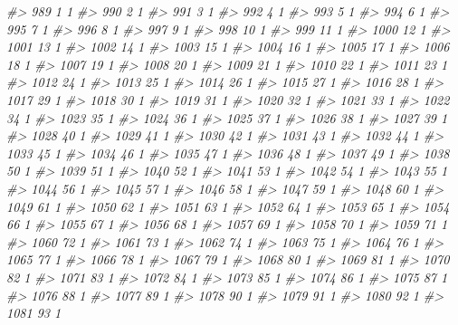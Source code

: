 \documentclass[]{article}
\newenvironment{Shaded}{\begin{snugshade}}{\end{snugshade}}
\newcommand{\CommentTok}[1]{\textcolor[rgb]{0.56,0.35,0.01}{\textit{#1}}}
\begin{document}
\begin{Shaded}
\begin{Highlighting}[]
\CommentTok{#> 989    1  1}
\CommentTok{#> 990    2  1}
\CommentTok{#> 991    3  1}
\CommentTok{#> 992    4  1}
\CommentTok{#> 993    5  1}
\CommentTok{#> 994    6  1}
\CommentTok{#> 995    7  1}
\CommentTok{#> 996    8  1}
\CommentTok{#> 997    9  1}
\CommentTok{#> 998   10  1}
\CommentTok{#> 999   11  1}
\CommentTok{#> 1000  12  1}
\CommentTok{#> 1001  13  1}
\CommentTok{#> 1002  14  1}
\CommentTok{#> 1003  15  1}
\CommentTok{#> 1004  16  1}
\CommentTok{#> 1005  17  1}
\CommentTok{#> 1006  18  1}
\CommentTok{#> 1007  19  1}
\CommentTok{#> 1008  20  1}
\CommentTok{#> 1009  21  1}
\CommentTok{#> 1010  22  1}
\CommentTok{#> 1011  23  1}
\CommentTok{#> 1012  24  1}
\CommentTok{#> 1013  25  1}
\CommentTok{#> 1014  26  1}
\CommentTok{#> 1015  27  1}
\CommentTok{#> 1016  28  1}
\CommentTok{#> 1017  29  1}
\CommentTok{#> 1018  30  1}
\CommentTok{#> 1019  31  1}
\CommentTok{#> 1020  32  1}
\CommentTok{#> 1021  33  1}
\CommentTok{#> 1022  34  1}
\CommentTok{#> 1023  35  1}
\CommentTok{#> 1024  36  1}
\CommentTok{#> 1025  37  1}
\CommentTok{#> 1026  38  1}
\CommentTok{#> 1027  39  1}
\CommentTok{#> 1028  40  1}
\CommentTok{#> 1029  41  1}
\CommentTok{#> 1030  42  1}
\CommentTok{#> 1031  43  1}
\CommentTok{#> 1032  44  1}
\CommentTok{#> 1033  45  1}
\CommentTok{#> 1034  46  1}
\CommentTok{#> 1035  47  1}
\CommentTok{#> 1036  48  1}
\CommentTok{#> 1037  49  1}
\CommentTok{#> 1038  50  1}
\CommentTok{#> 1039  51  1}
\CommentTok{#> 1040  52  1}
\CommentTok{#> 1041  53  1}
\CommentTok{#> 1042  54  1}
\CommentTok{#> 1043  55  1}
\CommentTok{#> 1044  56  1}
\CommentTok{#> 1045  57  1}
\CommentTok{#> 1046  58  1}
\CommentTok{#> 1047  59  1}
\CommentTok{#> 1048  60  1}
\CommentTok{#> 1049  61  1}
\CommentTok{#> 1050  62  1}
\CommentTok{#> 1051  63  1}
\CommentTok{#> 1052  64  1}
\CommentTok{#> 1053  65  1}
\CommentTok{#> 1054  66  1}
\CommentTok{#> 1055  67  1}
\CommentTok{#> 1056  68  1}
\CommentTok{#> 1057  69  1}
\CommentTok{#> 1058  70  1}
\CommentTok{#> 1059  71  1}
\CommentTok{#> 1060  72  1}
\CommentTok{#> 1061  73  1}
\CommentTok{#> 1062  74  1}
\CommentTok{#> 1063  75  1}
\CommentTok{#> 1064  76  1}
\CommentTok{#> 1065  77  1}
\CommentTok{#> 1066  78  1}
\CommentTok{#> 1067  79  1}
\CommentTok{#> 1068  80  1}
\CommentTok{#> 1069  81  1}
\CommentTok{#> 1070  82  1}
\CommentTok{#> 1071  83  1}
\CommentTok{#> 1072  84  1}
\CommentTok{#> 1073  85  1}
\CommentTok{#> 1074  86  1}
\CommentTok{#> 1075  87  1}
\CommentTok{#> 1076  88  1}
\CommentTok{#> 1077  89  1}
\CommentTok{#> 1078  90  1}
\CommentTok{#> 1079  91  1}
\CommentTok{#> 1080  92  1}
\CommentTok{#> 1081  93  1}

\end{Highlighting}
\end{Shaded}
\end{document}
